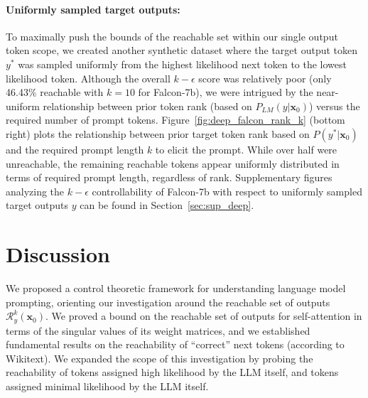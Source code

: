 \documentclass{article} %
\begin{document}
\paragraph{Uniformly sampled target outputs: } To maximally push the bounds of the reachable set within our single output token scope, we created another synthetic dataset where the target output token $y^*$ was sampled uniformly from the highest likelihood next token to the lowest likelihood token. 
Although the overall $k-\epsilon$ score was relatively poor (only 46.43\% reachable with $k=10$ for Falcon-7b), we were intrigued by the near-uniform relationship between prior token rank (based on $P_{LM}(y | \mathbf x_0)$) versus the required number of prompt tokens. 
Figure~\ref{fig:deep_falcon_rank_k} (bottom right) plots the relationship between prior target token rank based on $P(y^* | \mathbf x_0)$ and the required prompt length $k$ to elicit the prompt. While over half were unreachable, the remaining reachable tokens appear uniformly distributed in terms of required prompt length, regardless of rank. Supplementary figures analyzing the $k-\epsilon$ controllability of Falcon-7b with respect to uniformly sampled target outputs $y$ can be found in Section~\ref{sec:sup_deep}. 



\section{Discussion}
\label{sec:discussion}

We proposed a control theoretic framework for understanding language model prompting, orienting our investigation around the reachable set of outputs $\mathcal R_y^k(\mathbf x_0)$.
We proved a bound on the reachable set of outputs for self-attention in terms of the singular values of its weight matrices, and we established fundamental results on the reachability of ``correct'' next tokens (according to Wikitext). We expanded the scope of this investigation by probing the reachability of tokens assigned high likelihood by the LLM itself, and tokens assigned minimal likelihood by the LLM itself. 
\end{document}
